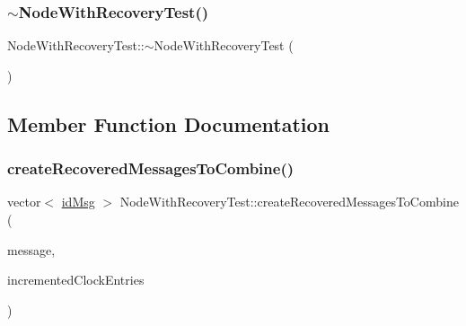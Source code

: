 \mbox{\label{class_node_with_recovery_test_a91ac9cad83523696aee1a5c5718a62af}} 
\subsubsection{\texorpdfstring{$\sim$\+Node\+With\+Recovery\+Test()}{~NodeWithRecoveryTest()}}
{\footnotesize\ttfamily Node\+With\+Recovery\+Test\+::$\sim$\+Node\+With\+Recovery\+Test (\begin{DoxyParamCaption}{ }\end{DoxyParamCaption})\hspace{0.3cm}{\ttfamily [virtual]}}



\subsection{Member Function Documentation}
\mbox{\label{class_node_with_recovery_test_aa6b94e1bff36f3ec804d4ba136de96b8}} 
\subsubsection{\texorpdfstring{create\+Recovered\+Messages\+To\+Combine()}{createRecoveredMessagesToCombine()}}
{\footnotesize\ttfamily vector$<$ \hyperlink{structures_8h_a83a1d9a070efa5341da84cfd8e28d3e5}{id\+Msg} $>$ Node\+With\+Recovery\+Test\+::create\+Recovered\+Messages\+To\+Combine (\begin{DoxyParamCaption}\item[{const \hyperlink{structures_8h_a7e7bdc1d2fff8a9436f2f352b2711ed6}{message\+Info} \&}]{message,  }\item[{const vector$<$ unsigned int $>$ \&}]{incremented\+Clock\+Entries }\end{DoxyParamCaption})\hspace{0.3cm}{\ttfamily [protected]}}



